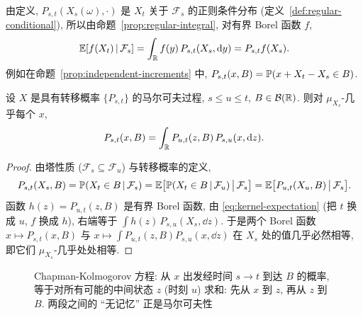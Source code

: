 由定义, $P_{s,t}(X_s(\omega),\cdot)$ 是 $X_t$ 关于 $\mathcal{F}_s$ 的正则条件分布 (定义~\ref{def:regular-conditional}), 所以由命题~\ref{prop:regular-integral}, 对有界 Borel 函数 $f$,
\begin{equation}\label{eq:kernel-expectation}
\E[f(X_t)\,|\,\mathcal{F}_s]=\int_{\R}f(y)\,P_{s,t}(X_s,\dd y)=P_{s,t}f(X_s).
\end{equation}
例如在命题~\ref{prop:independent-increments} 中, $P_{s,t}(x,B)=\P(x+X_t-X_s\in B)$.

\begin{theorem}\label{thm:chapman-kolmogorov}
设 $X$ 是具有转移概率 $\{P_{s,t}\}$ 的马尔可夫过程, $s\le u\le t$, $B\in\mathcal{B}(\R)$. 则对 $\mu_{X_s}$-几乎每个 $x$,
\[
P_{s,t}(x,B)=\int_{\R}P_{u,t}(z,B)\,P_{s,u}(x,\dd z).
\]
\end{theorem}

\begin{proof}
由塔性质 ($\mathcal{F}_s\subseteq\mathcal{F}_u$) 与转移概率的定义,
\[
P_{s,t}(X_s,B)=\P(X_t\in B\,|\,\mathcal{F}_s)=\E\big[\P(X_t\in B\,|\,\mathcal{F}_u)\,\big|\,\mathcal{F}_s\big]=\E\big[P_{u,t}(X_u,B)\,\big|\,\mathcal{F}_s\big].
\]
函数 $h(z)=P_{u,t}(z,B)$ 是有界 Borel 函数, 由 \eqref{eq:kernel-expectation} (把 $t$ 换成 $u$, $f$ 换成 $h$), 右端等于 $\int h(z)\,P_{s,u}(X_s,\dd z)$. 于是两个 Borel 函数 $x\mapsto P_{s,t}(x,B)$ 与 $x\mapsto\int P_{u,t}(z,B)P_{s,u}(x,\dd z)$ 在 $X_s$ 处的值几乎必然相等, 即它们 $\mu_{X_s}$-几乎处处相等.
\end{proof}

\begin{figure}[htbp]
\centering
{}
\caption{Chapman-Kolmogorov 方程: 从 $x$ 出发经时间 $s\to t$ 到达 $B$ 的概率, 等于对所有可能的中间状态 $z$ (时刻 $u$) 求和: 先从 $x$ 到 $z$, 再从 $z$ 到 $B$. 两段之间的 ``无记忆'' 正是马尔可夫性}
\label{fig:chapman-kolmogorov}
\end{figure}


